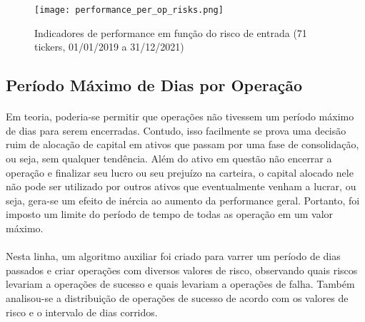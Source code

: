 \begin{figure}[!htb]
    \texttt{[image: performance\_per\_op\_risks.png]}
    \centering
    \caption{Indicadores de performance em função do risco de entrada (71 tickers, 01/01/2019 a 31/12/2021)}
    \label{fig:553}
\end{figure}



\FloatBarrier
\subsection{Período Máximo de Dias por Operação}
\label{sub:max_op_days}

\paragraph{} Em teoria, poderia-se permitir que operações não tivessem um período máximo de dias para serem encerradas. Contudo, isso facilmente se prova uma decisão ruim de alocação de capital em ativos que passam por uma fase de consolidação, ou seja, sem qualquer tendência. Além do ativo em questão não encerrar a operação e finalizar seu lucro ou seu prejuízo na carteira, o capital alocado nele não pode ser utilizado por outros ativos que eventualmente venham a lucrar, ou seja, gera-se um efeito de inércia ao aumento da performance geral. Portanto, foi imposto um limite do período de tempo de todas as operação em um valor máximo.



\paragraph{} Nesta linha, um algoritmo auxiliar foi criado para varrer um período de dias passados e criar operações com diversos valores de risco, observando quais riscos levariam a operações de sucesso e quais levariam a operações de falha. Também analisou-se a distribuição de operações de sucesso de acordo com os valores de risco e o intervalo de dias corridos.

